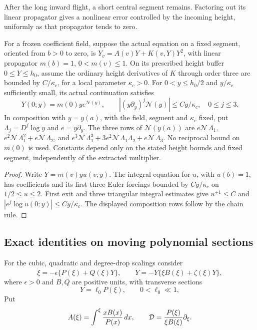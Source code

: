 After the long inward flight, a short central segment remains. Factoring
out its linear propagator gives a nonlinear error controlled by the
incoming height, uniformly as that propagator tends to zero.

\begin{lemma}
\label{deg:lem-compact-height-continuation}
For a frozen coefficient field, suppose the actual equation on a
fixed segment, oriented from \(b>0\) to zero, is
\(Y_v=A(v)Y+K(v,Y)Y^2\), with
linear propagator \(m(b)=1\), \(0<m(v)\le1\). On its prescribed
height buffer \(0\le Y\le h_0\), assume the ordinary height
derivatives of \(K\) through order three are bounded by
\(C/\kappa_c\), for a local parameter \(\kappa_c>0\).
For \(0<y\le h_0/2\) and \(y/\kappa_c\) sufficiently small,
its actual continuation satisfies
\begin{equation}\label{deg:scalar-compact-propagator}
 Y(0;y)=m(0)y e^{\mathcal N(y)},\qquad
 |(y\partial_y)^j\mathcal N(y)|\le Cy/\kappa_c,\quad0\le j\le3.
\end{equation}
In composition with \(y=y(a)\), with the field, segment and
\(\kappa_c\) fixed, put \(\Lambda_j=D^j\log y\) and
\(e=y\partial_y\). The three rows of \(\mathcal N(y(a))\) are
\(e\mathcal N\,\Lambda_1\),
\(e^2\mathcal N\,\Lambda_1^2+e\mathcal N\,\Lambda_2\), and
\(e^3\mathcal N\,\Lambda_1^3+3e^2\mathcal N\,\Lambda_1\Lambda_2
+e\mathcal N\,\Lambda_3\). No reciprocal bound on \(m(0)\) is used.
Constants depend only on the stated height bounds and fixed segment,
independently of the extracted multiplier.
\end{lemma}
\begin{proof}
Write \(Y=m(v)yu(v;y)\). The integral
equation for \(u\), with \(u(b)=1\), has coefficients and its first
three Euler forcings bounded by \(Cy/\kappa_c\) on
\(1/2\le u\le2\). First exit and three triangular integral
estimates give \(u^{\pm1}\le C\) and
\(|e^j\log u(0;y)|\le Cy/\kappa_c\). The displayed composition
rows follow by the chain rule.
\end{proof}



\subsection{Exact identities on moving polynomial sections}
\label{subsec:deg-moving-sections}

For the cubic, quadratic and degree-drop scalings consider
\begin{equation}
 \dot\xi=-\epsilon\{P(\xi)+Q(\xi)Y\},
 \qquad
 \dot Y=-Y\{\xi B(\xi)+\zeta(\xi)Y\},
 \label{deg:tail-field}
\end{equation}
where \(\epsilon>0\) and \(B,Q\) are positive units, with transverse sections
\begin{equation}
 Y=\ell_0P(\xi),\qquad 0<\ell_0\ll1,
 \label{deg:moving-section}
\end{equation}
Put
\[
 A(\xi)=\int^\xi {xB(x)\over P(x)}\,dx,
 \qquad \mathcal D={P(\xi)\over \xi B(\xi)}\partial_\xi .
\]

